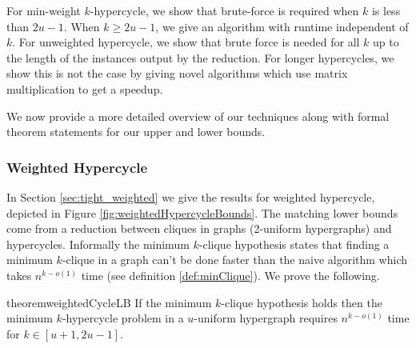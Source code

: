 \documentclass[11pt,letterpaper,pdftex]{article}
\newcounter{definition}
\begin{document}
For min-weight $k$-hypercycle, we show that brute-force is required when $k$ is less than $2u-1$.
When $k \geq 2u-1$, we give an algorithm with runtime independent of $k$.
For unweighted hypercycle, we show that brute force is needed for all $k$ up to the length of the instances output by the \cite{LVW18} reduction.
For longer hypercycles, we show this is not the case by giving novel algorithms which use matrix multiplication to get a speedup.

We now provide a more detailed overview of our techniques along with formal theorem statements for our upper and lower bounds.






\subsubsection{Weighted Hypercycle}
In Section \ref{sec:tight_weighted} we give the results for weighted hypercycle, depicted in Figure \ref{fig:weightedHypercycleBounds}. 
The matching lower bounds come from a reduction between cliques in graphs (2-uniform hypergraphs) and hypercycles. Informally the minimum $k$-clique hypothesis states that finding a minimum $k$-clique in a graph can't be done faster than the naive algorithm which takes $n^{k-o(1)}$ time (see definition \ref{def:minClique}). We prove the following. 
\begin{restatable}{theorem}{weightedCycleLB}
    If the minimum $k$-clique hypothesis holds then the minimum $k$-hypercycle problem in a $u$-uniform hypergraph requires $n^{k-o(1)}$ time for $k \in [u+1 , 2u-1]$. 
\end{restatable}
\end{document}
